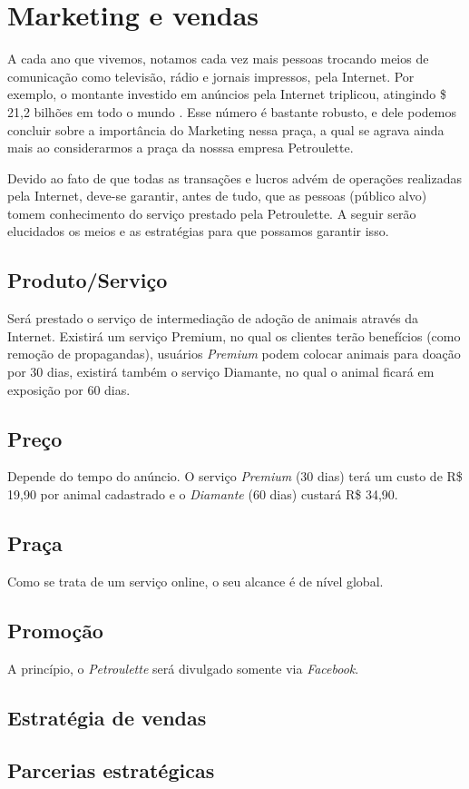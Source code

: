 \chapter{Marketing e vendas}
	A cada ano que vivemos, notamos cada vez mais pessoas trocando meios de comunicação como televisão, rádio e jornais impressos, pela Internet. Por exemplo, o montante investido em anúncios pela Internet triplicou, atingindo \$ 21,2 bilhões em todo o mundo \cite{moore2010marketing}. Esse número é bastante robusto, e dele podemos concluir sobre a importância do Marketing nessa praça, a qual se agrava ainda mais ao considerarmos a praça da nosssa empresa Petroulette.

	Devido ao fato de que todas as transações e lucros advém de operações realizadas pela Internet, deve-se garantir, antes de tudo, que as pessoas (público alvo) tomem conhecimento do serviço prestado pela Petroulette. A seguir serão elucidados os meios e as estratégias para que possamos garantir isso.



\section{Produto/Serviço}
	Será prestado o serviço de intermediação de adoção de animais através da Internet. Existirá um serviço Premium, no qual os clientes terão benefícios (como remoção de propagandas), usuários \emph{Premium} podem colocar animais para doação por 30 dias, existirá também o serviço Diamante, no qual o animal
	ficará em exposição por 60 dias.


\section{Preço}
	Depende do tempo do anúncio. O serviço \emph{Premium} (30 dias) terá um custo de R\$ 19,90 por animal cadastrado e o \emph{Diamante} (60 dias) custará R\$ 34,90.

\section{Praça}
	Como se trata de um serviço online, o seu alcance é de nível global.

\section{Promoção}
	A princípio, o \emph{Petroulette} será divulgado somente via \emph{Facebook}.

\section{Estratégia de vendas}


\section{Parcerias estratégicas}
	
